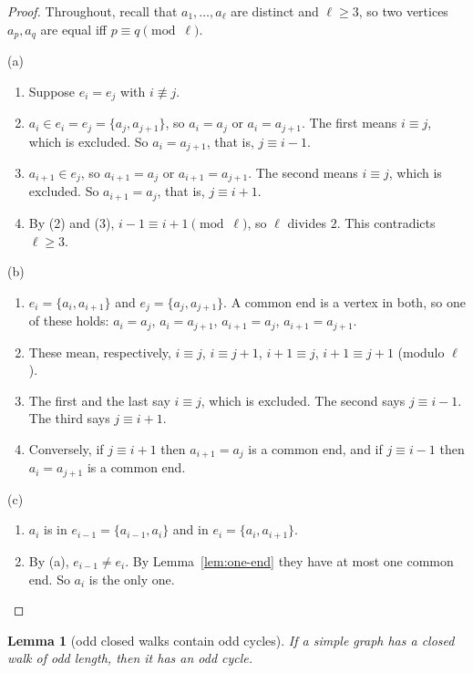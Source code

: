 \documentclass[11pt]{article}
\theoremstyle{plain}
\newtheorem{lemma}[theorem]{Lemma}
\theoremstyle{definition}
\theoremstyle{remark}
\newenvironment{steps}{\begin{enumerate}[label=(\arabic*),leftmargin=2.2em,itemsep=0.35em]}{\end{enumerate}}
\begin{document}
\begin{proof}
Throughout, recall that $a_1,\dots,a_\ell$ are distinct and $\ell\ge 3$, so two vertices
$a_p,a_q$ are equal iff $p\equiv q\pmod\ell$.

(a) \begin{steps}
  \item Suppose $e_i=e_j$ with $i\not\equiv j$.
  \item $a_i\in e_i=e_j=\{a_j,a_{j+1}\}$, so $a_i=a_j$ or $a_i=a_{j+1}$. The first means
    $i\equiv j$, which is excluded. So $a_i=a_{j+1}$, that is, $j\equiv i-1$.
  \item $a_{i+1}\in e_j$, so $a_{i+1}=a_j$ or $a_{i+1}=a_{j+1}$. The second means $i\equiv j$,
    which is excluded. So $a_{i+1}=a_j$, that is, $j\equiv i+1$.
  \item By (2) and (3), $i-1\equiv i+1\pmod\ell$, so $\ell$ divides $2$. This contradicts
    $\ell\ge 3$.
\end{steps}

(b) \begin{steps}
  \item $e_i=\{a_i,a_{i+1}\}$ and $e_j=\{a_j,a_{j+1}\}$. A common end is a vertex in both, so one
    of these holds: $a_i=a_j$, $a_i=a_{j+1}$, $a_{i+1}=a_j$, $a_{i+1}=a_{j+1}$.
  \item These mean, respectively, $i\equiv j$, $i\equiv j+1$, $i+1\equiv j$, $i+1\equiv j+1$
    (modulo $\ell$).
  \item The first and the last say $i\equiv j$, which is excluded. The second says
    $j\equiv i-1$. The third says $j\equiv i+1$.
  \item Conversely, if $j\equiv i+1$ then $a_{i+1}=a_j$ is a common end, and if $j\equiv i-1$
    then $a_i=a_{j+1}$ is a common end.
\end{steps}

(c) \begin{steps}
  \item $a_i$ is in $e_{i-1}=\{a_{i-1},a_i\}$ and in $e_i=\{a_i,a_{i+1}\}$.
  \item By (a), $e_{i-1}\ne e_i$. By Lemma~\ref{lem:one-end} they have at most one common end. So
    $a_i$ is the only one. \qedhere
\end{steps}
\end{proof}

\begin{lemma}[odd closed walks contain odd cycles]\label{lem:odd-walk}
If a simple graph has a closed walk of odd length, then it has an odd cycle.
\end{lemma}
\end{document}
